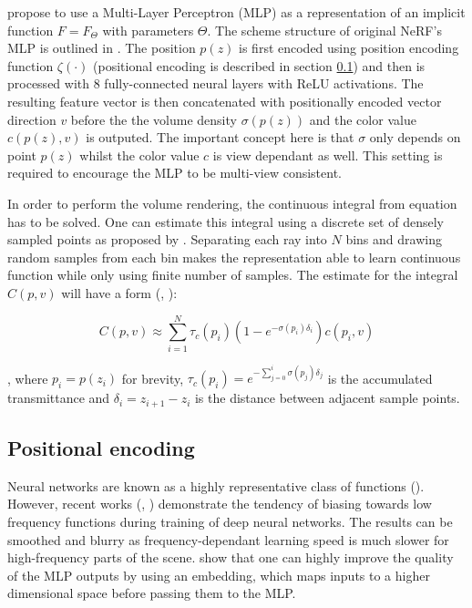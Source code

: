 \cite{mildenhall2020nerf} propose to use a Multi-Layer Perceptron (MLP) as a representation
of an implicit function $F = F_\Theta$ with parameters $\Theta$.
The scheme structure of original NeRF's MLP is outlined in .
The position $p(z)$ is first encoded using position encoding function $\zeta(\cdot)$ (positional encoding is described in section \ref{subsec:pos_enc}) and then is processed with 8 fully-connected neural layers with ReLU activations.
The resulting feature vector is then concatenated with positionally encoded vector direction $v$
before the the volume density $\sigma(p(z))$ and the color value $c(p(z), v)$ is outputed.
The important concept here is that $\sigma$ only depends on point $p(z)$
whilst the color value $c$ is view dependant as well.
This setting is required to encourage the MLP to be multi-view consistent.

In order to perform the volume rendering, the continuous integral from equation  has to be solved.
One can estimate this integral using a discrete set of densely sampled points as proposed by \cite{mildenhall2020nerf}.
Separating each ray into $N$ bins and drawing random samples from each bin
makes the representation able to learn continuous function
while only using finite number of samples.
The estimate for the integral $C(p, v)$ will have a form (\cite{mildenhall2020nerf}, \cite{max1995optical}):

\begin{equation}
    C(p, v) \approx \sum_{i=1}^{N} \tau_c(p_i) (1 - e^{-\sigma(p_i) \delta_i}) c(p_i, v)
\end{equation}

, where $p_i = p(z_i)$ for brevity, $\tau_c(p_i) = e^{-\sum_{j=0}^i \sigma(p_j) \delta_j }$ is the accumulated transmittance and $\delta_i = z_{i+1} - z_i$ is the distance between adjacent sample points.

\subsection{Positional encoding}
\label{subsec:pos_enc}

Neural networks are known as a highly representative class of functions (\cite{hornik1989multilayer}).
However, recent works (\cite{rahaman2019spectral}, \cite{tancik2020fourfeat}) demonstrate the tendency of
biasing towards low frequency functions during training of deep neural networks.
The results can be smoothed and blurry as frequency-dependant learning speed
is much slower for high-frequency parts of the scene.
\cite{rahaman2019spectral} show that one can highly improve the quality of the MLP outputs
by using an embedding, which maps inputs to a higher dimensional space before passing them to the MLP.

